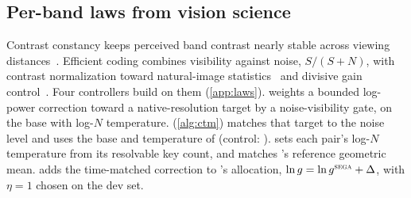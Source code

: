 \subsection{Per-band laws from vision science}\label{sec:ours}

Contrast constancy keeps perceived band contrast nearly stable across viewing distances~\citep{georgeson1975contrast}. Efficient coding combines visibility against noise, $S/(S+N)$, with contrast normalization toward natural-image statistics~\citep{atick1990towards,atick1992retina,vanhateren1992theory,field1987relations,dong1995statistics,knill1990human,parraga2000human} and divisive gain control~\citep{webster2002neural,heeger1992normalization,schwartz2001natural,carandini2012normalization}. Four controllers build on them (\cref{app:laws}). \textbf{\constancy} weights a bounded log-power correction toward a native-resolution target by a noise-visibility gate, on the \ntk{} base with log-$N$ temperature. \textbf{\constancytm} (\cref{alg:ctm}) matches that target to the noise level and uses the base and temperature of \segaofficial{} (control: \tempsb). \textbf{\aliastemp} sets each pair's log-$N$ temperature from its resolvable key count, and \aliastemps{} matches \sega's reference geometric mean. \textbf{\segactm} adds the time-matched correction to \sega's allocation, $\ln g=\ln g^{\textsc{sega}}+\Delta$, with $\eta=1$ chosen on the dev set.
